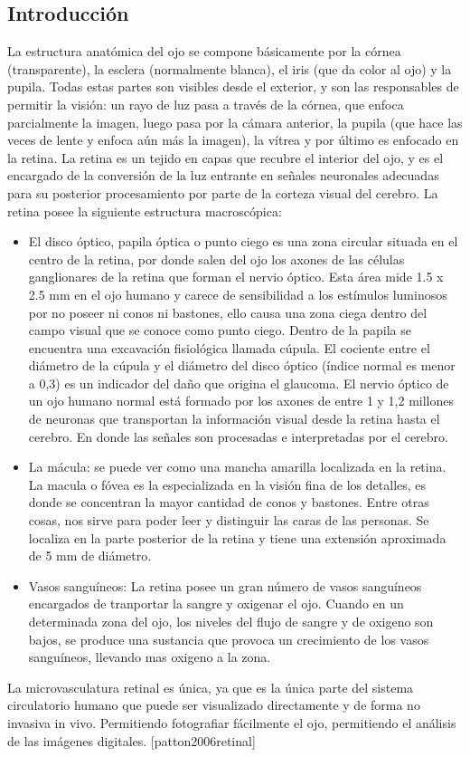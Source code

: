 \subsection{Introducci\'on}

La estructura anatómica del ojo se compone básicamente por la córnea (transparente), la esclera (normalmente blanca), el iris (que da color al ojo) y la pupila. Todas estas partes son visibles desde el exterior, y son las responsables de permitir la visión: un rayo de luz pasa a través de la córnea, que enfoca parcialmente la imagen, luego pasa por la cámara anterior, la pupila (que hace las veces de lente y enfoca aún más la imagen), la vítrea y por último es enfocado en la retina. La retina es un tejido en capas que recubre el interior del ojo, y es el encargado de la conversi\'on de la luz entrante en señales neuronales adecuadas para su posterior procesamiento por parte de la corteza visual del cerebro.
La retina posee la siguiente estructura macrosc\'opica:
\begin{itemize}
\item El disco \'optico, papila \'optica o punto ciego es una zona circular situada en el centro de la retina, por donde salen del ojo los axones de las c\'elulas ganglionares de la retina que forman el nervio \'optico. Esta \'area mide 1.5 x 2.5 mm en el ojo humano y carece de sensibilidad a los est\'imulos luminosos por no poseer ni conos ni bastones, ello causa una zona ciega dentro del campo visual que se conoce como punto ciego. Dentro de la papila se encuentra una excavaci\'on fisiol\'ogica llamada c\'upula. El cociente entre el di\'ametro de la c\'upula y el di\'ametro del disco \'optico (\'indice normal es menor a 0,3) es un indicador del daño que origina el glaucoma. El nervio \'optico de un ojo humano normal est\'a formado por los axones de entre 1 y 1,2 millones de neuronas que transportan la informaci\'on visual desde la retina hasta el cerebro. En donde las señales son procesadas e interpretadas por el cerebro.
\item La m\'acula: se puede ver como una mancha amarilla localizada en la retina. La macula o f\'ovea es la especializada en la visi\'on fina de los detalles, es donde se concentran la mayor cantidad de conos y bastones. Entre otras cosas, nos sirve para poder leer y distinguir las caras de las personas. Se localiza en la parte posterior de la retina y tiene una extensi\'on aproximada de 5 mm de di\'ametro.
\item Vasos sangu\'ineos: La retina posee un gran n\'umero de vasos sangu\'ineos encargados de tranportar la sangre y oxigenar el ojo. Cuando en un determinada zona del ojo, los niveles del flujo de sangre y de oxigeno son bajos, se produce una sustancia que provoca un crecimiento de los vasos sangu\'ineos, llevando mas oxigeno a la zona.
\end{itemize}
La microvasculatura retinal es \'unica, ya que es la \'unica parte del sistema circulatorio humano que puede ser visualizado directamente y de forma no invasiva in vivo. Permitiendo fotografiar f\'acilmente el ojo, permitiendo el an\'alisis de las im\'agenes digitales.  [patton2006retinal]

